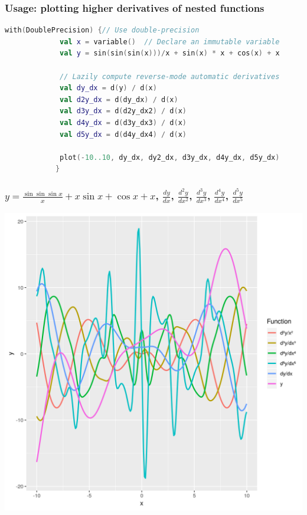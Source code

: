 \documentclass{beamer}
\begin{document}
    \begin{frame}[fragile]
        \frametitle{Usage: plotting higher derivatives of nested functions}
        \begin{lstlisting}[language=Kotlin, gobble=12]
            with(DoublePrecision) {// Use double-precision
             val x = variable()  // Declare an immutable variable
             val y = sin(sin(sin(x)))/x + sin(x) * x + cos(x) + x

             // Lazily compute reverse-mode automatic derivatives
             val dy_dx = d(y) / d(x)
             val d2y_dx = d(dy_dx) / d(x)
             val d3y_dx = d(d2y_dx2) / d(x)
             val d4y_dx = d(d3y_dx3) / d(x)
             val d5y_dx = d(d4y_dx4) / d(x)

             plot(-10..10, dy_dx, dy2_dx, d3y_dx, d4y_dx, d5y_dx)
            }
        \end{lstlisting}
    \end{frame}

    \begin{frame}
        \frametitle{$y = \frac{\sin{\sin{\sin{x}}}}{x} + x \sin{x} + \cos{x} + x$, $\frac{dy}{dx}$, $\frac{d^{2}y}{dx^2}$, $\frac{d^{3}y}{dx^3}$, $\frac{d^{4}y}{dx^4}$, $\frac{d^{5}y}{dx^5}$}
        \begin{center}
            \includegraphics[scale=0.4]{plot.png}
        \end{center}
    \end{frame}
\end{document}
